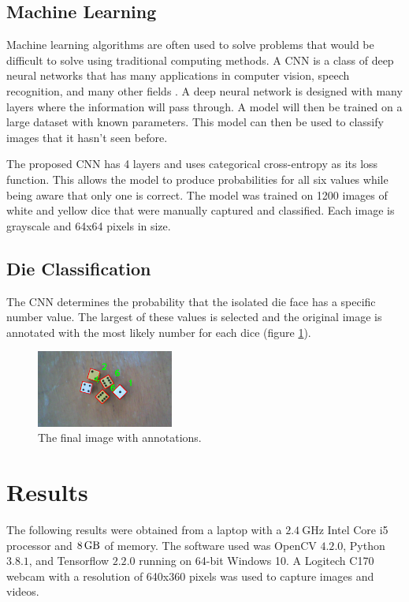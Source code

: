 \documentclass[conference]{IEEEtran}
\begin{document}
\subsection{Machine Learning}

Machine learning algorithms are often used to solve problems that would be difficult to solve using traditional computing methods.
A CNN is a class of deep neural networks that has many applications in computer vision, speech recognition, and many other fields \cite{Pena2014}\cite{Madabhushi2016}\cite{Lawrence1997}\cite{Kalchbrenner2014}.
A deep neural network is designed with many layers where the information will pass through.
A model will then be trained on a large dataset with known parameters.
This model can then be used to classify images that it hasn't seen before.

The proposed CNN has 4 layers and uses categorical cross-entropy as its loss function. 
This allows the model to produce probabilities for all six values while being aware that only one is correct.
The model was trained on 1200 images of white and yellow dice that were manually captured and classified.
Each image is grayscale and 64x64 pixels in size.

\subsection{Die Classification}

The CNN determines the probability that the isolated die face has a specific number value.
The largest of these values is selected and the original image is annotated with the most likely number for each dice (figure \ref{fig:annotated}).
\begin{figure}
	\centering
	\includegraphics[width=0.4\textwidth]{annotated}
	\caption{The final image with annotations.}
	\label{fig:annotated}
\end{figure}

\section{Results}

The following results were obtained from a laptop with a $\SI{2.4}{\giga\hertz}$ Intel Core i5 processor and $\SI{8}{\giga\byte}$ of memory.
The software used was OpenCV $4.2.0$, Python $3.8.1$, and Tensorflow $2.2.0$ running on 64-bit Windows 10.
A Logitech C170 webcam with a resolution of 640x360 pixels was used to capture images and videos.
\end{document}
